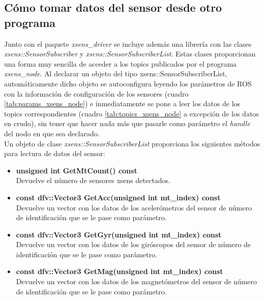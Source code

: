 \documentclass[12pt, a4paper]{report}
\begin{document}
\subsection{Cómo tomar datos del sensor desde otro programa}

Junto con el paquete \textit{xsens\_driver} se incluye además una librería con las clases \textit{xsens::SensorSubscriber} y \textit{xsens::SensorSubscriberList}. Estas clases proporcionan una forma muy sencilla de acceder a los topics publicados por el programa \textit{xsens\_node}. Al declarar un objeto del tipo xsens::SensorSubscriberList, automáticamente dicho objeto se autoconfigura leyendo los parámetros de ROS con la información de configuración de los sensores (cuadro \ref{tab:params_xsens_node}) e inmediatamente se pone a leer los datos de los topics correspondientes (cuadro \ref{tab:topics_xsens_node} a excepción de los datos en crudo), sin tener que hacer nada más que pasarle como parámetro el \textit{handle} del nodo en que sea declarado.\\

Un objeto de clase \textit{xsens::SensorSubscriberList} proporciona los siguientes métodos para lectura de datos del sensor:

\begin{itemize}

\item \textbf{unsigned int GetMtCount() const}\\
Devuelve el número de sensores xsens detectados.

\item \textbf{const dfv::Vector3 GetAcc(unsigned int mt\_index) const}\\
Devuelve un vector con los datos de los acelerómetros del sensor de número de identificación que se le pase como parámetro.

\item \textbf{const dfv::Vector3 GetGyr(unsigned int mt\_index) const}\\
Devuelve un vector con los datos de los giróscopos del sensor de número de identificación que se le pase como parámetro.

\item \textbf{const dfv::Vector3 GetMag(unsigned int mt\_index) const}\\
Devuelve un vector con los datos de los magnetómetros del sensor de número de identificación que se le pase como parámetro.

\end{itemize}
\end{document}
